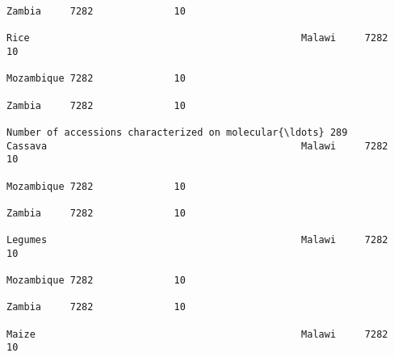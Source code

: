 \documentclass[11pt]{article}
\begin{document}
\begin{Verbatim}[commandchars=\\\{\}]
                                                                                                                                                                                                                 Zambia     7282              10  
                                                                                                                                                              Rice                                               Malawi     7282              10  
                                                                                                                                                                                                                 Mozambique 7282              10  
                                                                                                                                                                                                                 Zambia     7282              10  
                                                                         Number of accessions characterized on molecular{\ldots} 289                               Cassava                                            Malawi     7282              10  
                                                                                                                                                                                                                 Mozambique 7282              10  
                                                                                                                                                                                                                 Zambia     7282              10  
                                                                                                                                                              Legumes                                            Malawi     7282              10  
                                                                                                                                                                                                                 Mozambique 7282              10  
                                                                                                                                                                                                                 Zambia     7282              10  
                                                                                                                                                              Maize                                              Malawi     7282              10  

\end{Verbatim}
\end{document}
